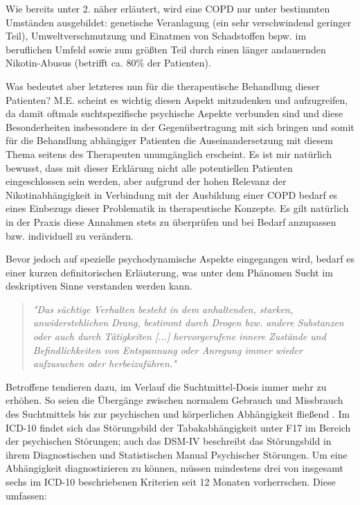 Wie bereits unter 2. näher erläutert, wird eine COPD nur unter bestimmten Umständen ausgebildet: genetische Veranlagung (ein sehr verschwindend geringer Teil), Umweltverschmutzung und Einatmen von Schadstoffen bspw. im beruflichen Umfeld sowie zum größten Teil durch einen länger andauernden Nikotin-Abusus (betrifft ca. 80\% der Patienten). 

Was bedeutet aber letzteres nun für die therapeutische Behandlung dieser Patienten? M.E. scheint es wichtig diesen Aspekt mitzudenken und aufzugreifen, da damit oftmals  suchtspezifische psychische Aspekte verbunden sind und diese Besonderheiten insbesondere in der Gegenübertragung mit sich bringen und somit für die Behandlung abhängiger Patienten die Auseinandersetzung mit diesem Thema seitens des Therapeuten unumgänglich erscheint. Es ist mir natürlich bewusst, dass mit dieser Erklärung nicht alle potentiellen Patienten eingeschlossen sein werden, aber aufgrund der hohen Relevanz der Nikotinabhängigkeit in Verbindung mit der Ausbildung einer COPD bedarf es eines Einbezugs dieser Problematik in therapeutische Konzepte. Es gilt natürlich in der Praxis diese Annahmen stets zu überprüfen und bei Bedarf anzupassen bzw. individuell zu verändern. 

Bevor jedoch auf spezielle psychodynamische Aspekte eingegangen wird, bedarf es einer kurzen definitorischen Erläuterung, was unter dem Phänomen Sucht im deskriptiven Sinne verstanden werden kann. 
\begin{quote}
\emph{"Das süchtige Verhalten besteht in dem anhaltenden, starken, unwiderstehlichen Drang, bestimmt durch Drogen bzw. andere Substanzen oder auch durch Tätigkeiten [...] hervorgerufene innere Zustände und Befindlichkeiten von Entspannung oder Anregung immer wieder aufzusuchen oder herbeizuführen."} \autocite[173]{mentzos2011} 
\end{quote}
Betroffene tendieren dazu, im Verlauf die Suchtmittel-Dosis immer mehr zu erhöhen. So seien die Übergänge zwischen normalem Gebrauch und Missbrauch des Suchtmittels bis zur psychischen und körperlichen Abhängigkeit fließend \autocite[vgl.][173]{mentzos2011}. Im ICD-10 findet sich das Störungsbild der Tabakabhängigkeit unter F17 im Bereich der psychischen Störungen; auch das DSM-IV beschreibt das Störungsbild in ihrem Diagnostischen und Statistischen Manual Psychischer Störungen. Um eine Abhängigkeit diagnostizieren zu können, müssen mindestens drei von insgesamt sechs im ICD-10 beschriebenen Kriterien seit 12 Monaten vorherrschen. Diese umfassen:

